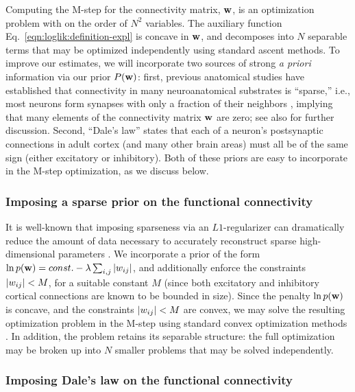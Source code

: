 Computing the M-step for the connectivity matrix, $\mathbf{w}$, is an optimization problem with on the order of $N^2$ variables. The auxiliary function Eq.~\eqref{eqn:loglik:definition-expl} is concave in $\mathbf{w}$, and decomposes into $N$ separable terms that may be optimized independently using standard ascent methods. To improve our estimates, we will incorporate two sources of strong \emph{a priori} information via our prior $P(\mathbf{w})$: first, previous anatomical studies have established that connectivity in many neuroanatomical substrates is ``sparse,'' i.e., most neurons form synapses with only a fraction of their neighbors \cite{Buhl94,Thompson88,Reyes98,Feldmeyer99,Gupta00,FeldmeyerSakmann00,PetersenSakmann00,Binzegger04,Song2005,Mishchenko2009b}, implying that many elements of the connectivity matrix $\mathbf{w}$ are zero; see also \cite{PAN04c,Rigat06,PILL07,Stevenson08} for further discussion. Second, ``Dale's law'' states that each of a neuron's postsynaptic connections in adult cortex (and many other brain areas) must all be of the same sign (either excitatory or inhibitory). Both of these priors are easy to incorporate in the M-step optimization, as we discuss below.


\subsubsection{Imposing a sparse prior on the functional connectivity}

It is well-known that imposing sparseness via an $L1$-regularizer can dramatically reduce the amount of data necessary to accurately reconstruct sparse high-dimensional parameters \cite{Tibs96,TIP01,DE03,NG04,Candes2005,Mishchenko2009}. We incorporate a prior of the form $\ln p(\mathbf{w}) = const. - \lambda \sum_{i,j} |w_{ij}|$, and additionally enforce the constraints $|w_{ij}|<M$, for a suitable constant $M$ (since both excitatory and inhibitory cortical connections are known to be bounded in size). Since the penalty $\ln p(\mathbf{w})$ is concave, and the constraints $|w_{ij}|<M$ are convex, we may solve the resulting optimization problem in the M-step using standard convex optimization methods \cite{CONV04}. In addition, the problem retains its separable structure: the full optimization may be broken up into $N$ smaller problems that may be solved independently.

\subsubsection{Imposing Dale's law on the functional connectivity}

